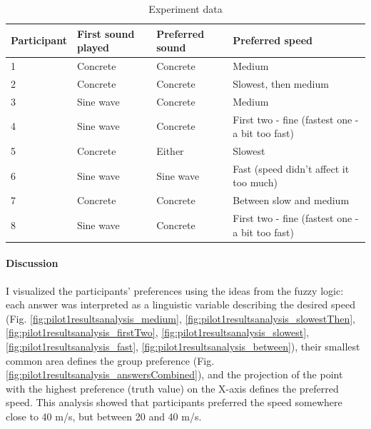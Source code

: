 \begin{table}[h]
	\label{table:pilot1_results}
	\caption{Experiment data}
	
	\begin{tabularx}{\linewidth}{|l|l|l|X|}
		\hline
		\textbf{Participant} & \textbf{First sound played} & \textbf{Preferred sound} & \textbf{Preferred speed}                        \\ \hline
		1                    & Concrete                    & Concrete                 & Medium                                          \\ \hline
		2                    & Concrete                    & Concrete                 & Slowest, then medium                            \\ \hline
		3                    & Sine wave                   & Concrete                 & Medium                                          \\ \hline
		4                    & Sine wave                   & Concrete                 & First two - fine (fastest one - a bit too fast)  \\ \hline
		5                    & Concrete                    & Either                   & Slowest                                         \\ \hline
		6                    & Sine wave                   & Sine wave                & Fast (speed didn't affect it too much)          \\ \hline
		7                    & Concrete                    & Concrete                 & Between slow and medium                         \\ \hline
		8                    & Sine wave                   & Concrete                 & First two - fine (fastest one - a bit too fast) \\ \hline
	\end{tabularx}
\end{table}

\paragraph{Discussion}
I visualized the participants' preferences using the ideas from the fuzzy logic: each answer was interpreted as a linguistic variable describing the desired speed (Fig. \ref{fig:pilot1resultsanalysis_medium}, \ref{fig:pilot1resultsanalysis_slowestThen}, \ref{fig:pilot1resultsanalysis_firstTwo}, \ref{fig:pilot1resultsanalysis_slowest}, \ref{fig:pilot1resultsanalysis_fast}, \ref{fig:pilot1resultsanalysis_between}), their smallest common area defines the group preference (Fig. \ref{fig:pilot1resultsanalysis_answersCombined}), and the projection of the point with the highest preference (truth value) on the X-axis defines the preferred speed.
This analysis showed that participants preferred the speed somewhere close to 40 m/s, but between 20 and 40 m/s.

